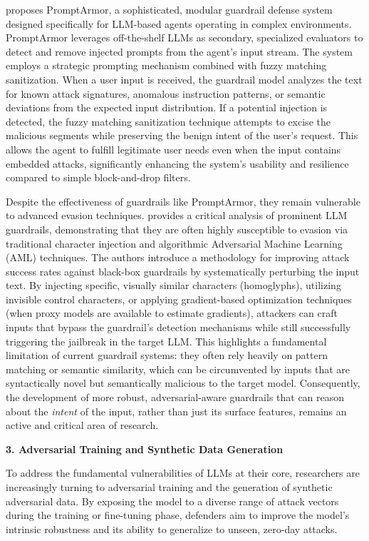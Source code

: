 \documentclass[11pt,a4paper]{article}
\begin{document}
\cite{Shi_2025_Promptarmor} proposes PromptArmor, a sophisticated, modular guardrail defense system designed specifically for LLM-based agents operating in complex environments. PromptArmor leverages off-the-shelf LLMs as secondary, specialized evaluators to detect and remove injected prompts from the agent's input stream. The system employs a strategic prompting mechanism combined with fuzzy matching sanitization. When a user input is received, the guardrail model analyzes the text for known attack signatures, anomalous instruction patterns, or semantic deviations from the expected input distribution. If a potential injection is detected, the fuzzy matching sanitization technique attempts to excise the malicious segments while preserving the benign intent of the user's request. This allows the agent to fulfill legitimate user needs even when the input contains embedded attacks, significantly enhancing the system's usability and resilience compared to simple block-and-drop filters.

Despite the effectiveness of guardrails like PromptArmor, they remain vulnerable to advanced evasion techniques. \cite{Hackett_2025_LLM} provides a critical analysis of prominent LLM guardrails, demonstrating that they are often highly susceptible to evasion via traditional character injection and algorithmic Adversarial Machine Learning (AML) techniques. The authors introduce a methodology for improving attack success rates against black-box guardrails by systematically perturbing the input text. By injecting specific, visually similar characters (homoglyphs), utilizing invisible control characters, or applying gradient-based optimization techniques (when proxy models are available to estimate gradients), attackers can craft inputs that bypass the guardrail's detection mechanisms while still successfully triggering the jailbreak in the target LLM. This highlights a fundamental limitation of current guardrail systems: they often rely heavily on pattern matching or semantic similarity, which can be circumvented by inputs that are syntactically novel but semantically malicious to the target model. Consequently, the development of more robust, adversarial-aware guardrails that can reason about the \textit{intent} of the input, rather than just its surface features, remains an active and critical area of research.

\textbf{3. Adversarial Training and Synthetic Data Generation}

To address the fundamental vulnerabilities of LLMs at their core, researchers are increasingly turning to adversarial training and the generation of synthetic adversarial data. By exposing the model to a diverse range of attack vectors during the training or fine-tuning phase, defenders aim to improve the model's intrinsic robustness and its ability to generalize to unseen, zero-day attacks.
\end{document}

